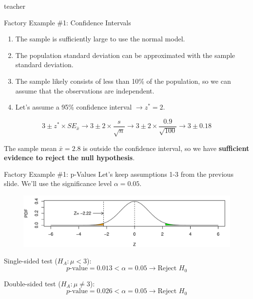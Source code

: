 \begin{shownto}{teacher}
    \begin{frame}{Factory Example \#1: Confidence Intervals}
    
        \begin{enumerate}
            \item The sample is sufficiently large to use the normal model.
            \item The population standard deviation can be approximated with the sample standard deviation.
            \item The sample likely consists of less than 10\% of the population, so we can assume that the observations are independent.
            \item Let's assume a 95\% confidence interval $\rightarrow z^* = 2$.
        \end{enumerate}
    
        \begin{equation*}
        3 \pm z^* \times SE_{\bar{x}} \rightarrow
        3 \pm 2 \times \frac{s}{\sqrt{n}} \rightarrow
        3 \pm 2 \times \frac{0.9}{\sqrt{100}} \rightarrow
        3 \pm 0.18
        \end{equation*}
        \medskip
    
        The sample mean $\bar{x} = 2.8$ is outside the confidence interval, so we have \textbf{sufficient evidence to reject the null hypothesis}.
        
    \end{frame}
    
    \begin{frame}{Factory Example \#1: p-Values}
        Let's keep assumptions 1-3 from the previous slide. We'll use the significance level $\alpha = 0.05$.
        
        \begin{figure}
            \includegraphics[width=\linewidth]{R/plots/factory-1-p-value}
        \end{figure}
    
        Single-sided test ($H_A: \mu < 3$):
        \begin{equation*}
        p\text{-value} = 0.013 < \alpha = 0.05 \rightarrow \text{Reject } H_0
        \end{equation*}
    
        Double-sided test ($H_A: \mu \ne 3$):
        \begin{equation*}
        p\text{-value} = 0.026 < \alpha = 0.05 \rightarrow \text{Reject } H_0
        \end{equation*}
    
    \end{frame}
\end{shownto}

